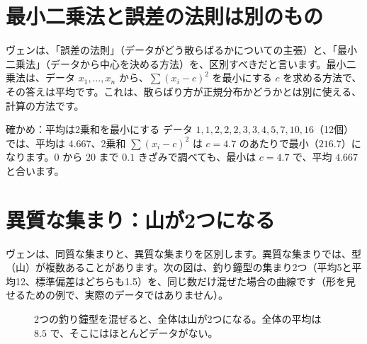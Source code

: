 \documentclass[a4paper,11pt,openany]{ltjsbook}
\begin{document}
\section{最小二乗法と誤差の法則は別のもの}

ヴェンは、「誤差の法則」（データがどう散らばるかについての主張）と、「最小二乗法」（データから中心を決める方法）を、区別すべきだと言います。最小二乗法は、データ $x_1,\ldots,x_n$ から、$\sum(x_i-c)^2$ を最小にする $c$ を求める方法で、その答えは平均です。これは、散らばり方が正規分布かどうかとは別に使える、計算の方法です。

\begin{examplebox}{確かめ：平均は2乗和を最小にする}
データ $1,1,2,2,2,3,3,4,5,7,10,16$（12個）では、平均は $4.667$、2乗和 $\sum(x_i-c)^2$ は $c=4.7$ のあたりで最小（$216.7$）になります。$0$ から $20$ まで $0.1$ きざみで調べても、最小は $c=4.7$ で、平均 $4.667$ と合います。
\end{examplebox}

\section{異質な集まり：山が2つになる}

ヴェンは、同質な集まりと、異質な集まりを区別します。異質な集まりでは、型（山）が複数あることがあります。次の図は、釣り鐘型の集まり2つ（平均5と平均12、標準偏差はどちらも1.5）を、同じ数だけ混ぜた場合の曲線です（形を見せるための例で、実際のデータではありません）。

\begin{figure}[htbp]
\centering
{}
\caption{2つの釣り鐘型を混ぜると、全体は山が2つになる。全体の平均は $8.5$ で、そこにはほとんどデータがない。}
\end{figure}
\end{document}
